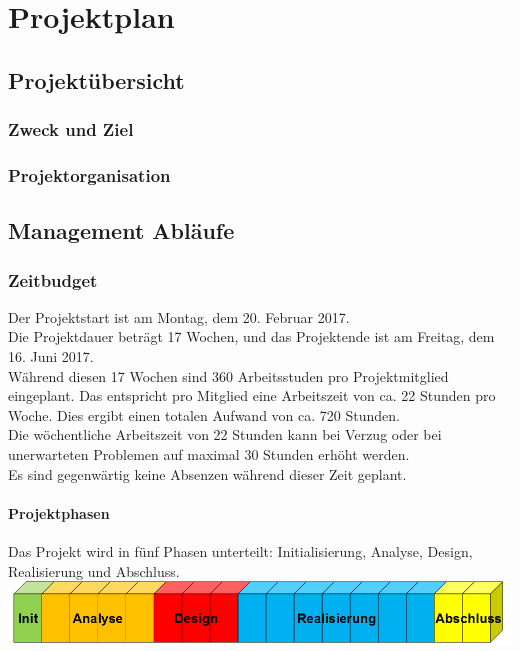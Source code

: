 \chapter{Projektplan}
\section{Projektübersicht}
\subsection{Zweck und Ziel}
\subsection{Projektorganisation}
\section{Management Abläufe}
\subsection{Zeitbudget}
Der Projektstart ist am Montag, dem 20. Februar 2017. \\
Die Projektdauer beträgt 17 Wochen, und das Projektende ist am Freitag, dem 16. Juni 2017. \\

\noindent Während diesen 17 Wochen sind 360 Arbeitsstuden pro Projektmitglied eingeplant. Das entspricht pro Mitglied eine Arbeitszeit von ca. 22 Stunden pro Woche. Dies ergibt einen totalen Aufwand von ca. 720 Stunden.\\

\noindent Die wöchentliche Arbeitszeit von 22 Stunden kann bei Verzug oder bei unerwarteten Problemen auf maximal 30 Stunden erhöht werden. \\

\noindent Es sind gegenwärtig keine Absenzen während dieser Zeit geplant.

\subsubsection{Projektphasen}
Das Projekt wird in fünf Phasen unterteilt: Initialisierung, Analyse, Design, Realisierung und Abschluss.
\newline
\newline
\includegraphics[width=1\textwidth]{images/phasen.png}
\newpage

